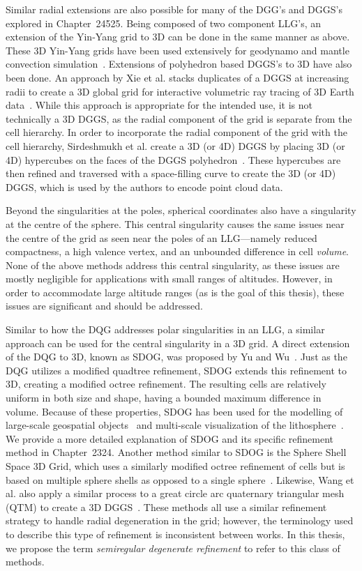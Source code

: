 Similar radial extensions are also possible for many of the DGG's and DGGS's explored in Chapter~24525.
Being composed of two component LLG's, an extension of the Yin-Yang grid to 3D can be done in the same manner as above.
These 3D Yin-Yang grids have been used extensively for geodynamo and mantle convection simulation~\cite{yoshida2004application, kageyama2005geodynamo, tackley2008modelling}.
Extensions of polyhedron based DGGS's to 3D have also been done.
An approach by Xie et al. stacks duplicates of a DGGS at increasing radii to create a 3D global grid for interactive volumetric ray tracing of 3D Earth data~\cite{xie2013interactive}.
While this approach is appropriate for the intended use, it is not technically a 3D DGGS, as the radial component of the grid is separate from the cell hierarchy.
In order to incorporate the radial component of the grid with the cell hierarchy, Sirdeshmukh et al. create a 3D (or 4D) DGGS by placing 3D (or 4D) hypercubes on the faces of the DGGS polyhedron~\cite{sirdeshmukh2019utilizing}.
These hypercubes are then refined and traversed with a space-filling curve to create the 3D (or 4D) DGGS, which is used by the authors to encode point cloud data.


Beyond the singularities at the poles, spherical coordinates also have a singularity at the centre of the sphere.
This central singularity causes the same issues near the centre of the grid as seen near the poles of an LLG---namely reduced compactness, a high valence vertex, and an unbounded difference in cell \textit{volume}.
None of the above methods address this central singularity, as these issues are mostly negligible for applications with small ranges of altitudes.
However, in order to accommodate large altitude ranges (as is the goal of this thesis), these issues are significant and should be addressed.


Similar to how the DQG addresses polar singularities in an LLG, a similar approach can be used for the central singularity in a 3D grid.
A direct extension of the DQG to 3D, known as SDOG, was proposed by Yu and Wu~\cite{yu2009sdog}.
Just as the DQG utilizes a modified quadtree refinement, SDOG extends this refinement to 3D, creating a modified octree refinement.
The resulting cells are relatively uniform in both size and shape, having a bounded maximum difference in volume.
Because of these properties, SDOG has been used for the modelling of large-scale geospatial objects~\cite{yu2012large-scale} and multi-scale visualization of the lithosphere~\cite{yu2012lithosphere}.
We provide a more detailed explanation of SDOG and its specific refinement method in Chapter~2324.
Another method similar to SDOG is the Sphere Shell Space 3D Grid, which uses a similarly modified octree refinement of cells but is based on multiple sphere shells as opposed to a single sphere~\cite{gang2013sphere}.
Likewise, Wang et al. also apply a similar process to a great circle arc quaternary triangular mesh (QTM) to create a 3D DGGS~\cite{wang2013global}.
These methods all use a similar refinement strategy to handle radial degeneration in the grid; however, the terminology used to describe this type of refinement is inconsistent between works.
In this thesis, we propose the term \textit{semiregular degenerate refinement} to refer to this class of methods.



